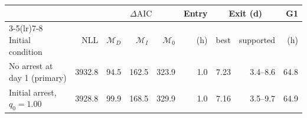 \setlength{\tabcolsep}{4pt}
\begin{tabular}{@{}lrrrrrrrr@{}}
\toprule
 & & \multicolumn{3}{c}{$\Delta\mathrm{AIC}$} & Entry & \multicolumn{2}{c}{Exit (d)} & G1 \\
\cmidrule(lr){3-5}\cmidrule(lr){7-8}
Initial condition & NLL & $\mathcal{M}_D$ & $\mathcal{M}_I$ & $\mathcal{M}_0$ & (h) & best & supported & (h) \\
\midrule
No arrest at day 1 (primary) & 3932.8 & 94.5 & 162.5 & 323.9 & 1.0 & 7.23 & 3.4--8.6 & 64.8 \\
Initial arrest, $q_0=1.00$ & 3928.8 & 99.9 & 168.5 & 329.9 & 1.0 & 7.16 & 3.5--9.7 & 64.9 \\
\bottomrule
\end{tabular}
